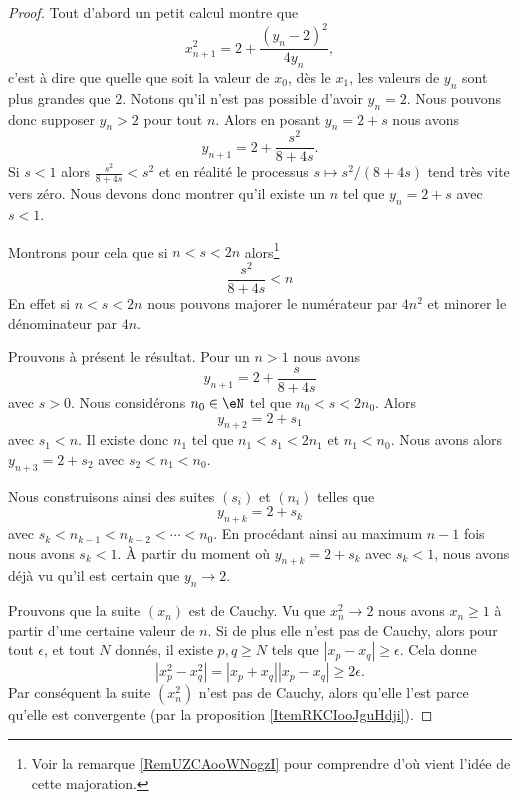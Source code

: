 \begin{proof}
    Tout d'abord un petit calcul montre que
    \begin{equation}
        x_{n+1}^2=2+\frac{ (y_n-2)^2 }{ 4y_n },
    \end{equation}
    c'est à dire que quelle que soit la valeur de \( x_0\), dès le \( x_1\), les valeurs de \( y_n\) sont plus grandes que \( 2\). Notons qu'il n'est pas possible d'avoir \( y_n=2\). Nous pouvons donc supposer \( y_n>2\) pour tout \( n\). Alors en posant \( y_n=2+s\) nous avons
    \begin{equation}
        y_{n+1}=2+\frac{ s^2 }{ 8+4s }.
    \end{equation}
    Si \( s<1\) alors \( \frac{ s^2 }{ 8+4s }<s^2\) et en réalité le processus \( s\mapsto s^2/(8+4s)\) tend très vite vers zéro. Nous devons donc montrer qu'il existe un \( n\) tel que \( y_n=2+s\) avec \( s<1\).

    Montrons pour cela que si \( n<s<2n\) alors\footnote{Voir la remarque \ref{RemUZCAooWNogzI} pour comprendre d'où vient l'idée de cette majoration.}
    \begin{equation}\label{EqYNKQooUBfhgz}
        \frac{ s^2 }{ 8+4s }<n
    \end{equation}
    En effet si \( n<s<2n\) nous pouvons majorer le numérateur par \( 4n^2\) et minorer le dénominateur par \( 4n\).

    Prouvons à présent le résultat. Pour un \( n>1\) nous avons
    \begin{equation}
        y_{n+1}=2+\frac{ s }{ 8+4s }
    \end{equation}
    avec \( s>0\). Nous considérons \( n_0\in \eN\) tel que \( n_0<s<2n_0\). Alors
    \begin{equation}
        y_{n+2}=2+s_1
    \end{equation}
    avec \( s_1<n\). Il existe donc \( n_1\) tel que \( n_1<s_1<2n_1\) et \( n_1<n_0\). Nous avons alors \( y_{n+3}=2+s_2\) avec \( s_2<n_1<n_0\).

    Nous construisons ainsi des suites \( (s_i)\) et \( (n_i)\) telles que 
    \begin{equation}
        y_{n+k}=2+s_k
    \end{equation}
    avec \( s_k<n_{k-1}<n_{k-2}<\cdots<n_0\). En procédant ainsi au maximum \( n-1\) fois nous avons \( s_k<1\). À partir du moment où \( y_{n+k}=2+s_k\) avec \( s_k<1\), nous avons déjà vu qu'il est certain que \( y_n\to 2\).

    Prouvons que la suite \( (x_n)\) est de Cauchy. Vu que \( x_n^2\to 2\) nous avons \( x_n\geq 1\) à partir d'une certaine valeur de \( n\). Si de plus elle n'est pas de Cauchy, alors pour tout \( \epsilon\), et tout \( N\) donnés, il existe \( p,q\geq N\) tels que \( | x_p-x_q |\geq \epsilon\). Cela donne
    \begin{equation}
        | x_p^2-x_q^2 |=| x_p+x_q | |x_p-x_q |\geq 2\epsilon.
    \end{equation}
    Par conséquent la suite \( (x_n^2)\) n'est pas de Cauchy, alors qu'elle l'est parce qu'elle est convergente (par la proposition \ref{ItemRKCIooJguHdji}).


\end{proof}

